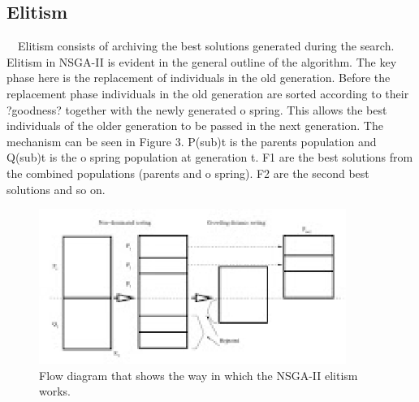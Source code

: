 \subsection[Elitism]{\label{identificadorReferenciaCruzada}
Elitism}

\ \ Elitism consists of archiving the best solutions generated during the search. Elitism in NSGA-II is evident in the general outline of the algorithm. The key phase here is the replacement of individuals in the old generation. Before the replacement phase individuals in the old generation are sorted according to their ?goodness? together with the newly generated o spring. This allows the best individuals of the older generation to be passed in the next generation. The mechanism can be seen in Figure 3. P(sub)t is the parents population and Q(sub)t is the o spring population at generation t. F1 are the best solutions from the combined populations (parents and
o spring). F2 are the second best solutions and so on.

\begin{figure}[h!]
\begin{center}
\includegraphics[width = 10cm] {./Graphics/Figure3.eps} 

\caption{Flow diagram that shows the way in which the NSGA-II elitism works.}
\end{center}
\end{figure}